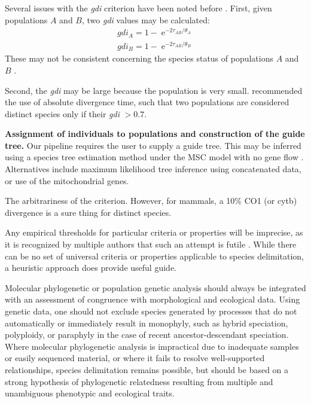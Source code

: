 \documentclass[A4]{article1}
\DeclareMathOperator{\e}{\mathrm{e}}
\begin{document}
Several issues with the \textit{gdi} criterion have been noted before \citep{Leache2019}.  
First, given populations $A$ and $B$, two \textit{gdi} values may be calculated:
\begin{equation}
   \begin{aligned}
      gdi_A = 1 - \e^{-2\tau _{AB}/\theta_A} \\
      gdi_B = 1 - \e^{-2\tau _{AB}/\theta_B}
   \end{aligned}
\end{equation}
These may not be consistent concerning the species status of populations $A$ and $B$
\citep{Leache2019}.

Second, the \textit{gdi} may be large because the population is very small.
\citet{Rannala2020} recommended the use of absolute divergence time, such that two
populations are considered distinct species only if their \textit{gdi} $> 0.7$.

\textbf{Assignment of individuals to populations and construction of the guide tree.}
Our pipeline requires the user to supply a guide tree.  This may be inferred using a
species tree estimation method under the MSC model with no gene flow \citep{Yang2014,
   Rannala2017}.  Alternatives include maximum likelihood tree inference using concatenated
data, or use of the mitochondrial genes.

The arbitrariness of the criterion.  However, for mammals, a 10\% CO1 (or cytb)
divergence is a sure thing for distinct species.

Any empirical thresholds for particular criteria or properties will be imprecise, as it
is recognized by multiple authors that such an attempt is futile \cite{Wells2022}. While
there can be no set of universal criteria or properties applicable to species
delimitation, a heuristic approach does provide useful guide.

Molecular phylogenetic or population genetic analysis should always be integrated with
an assessment of congruence with morphological and ecological data.  Using genetic data,
one should not exclude species generated by processes that do not automatically or
immediately result in monophyly, such as hybrid speciation, polyploidy, or paraphyly in
the case of recent ancestor-descendant speciation.  Where molecular phylogenetic
analysis is impractical due to inadequate samples or easily sequenced material, or where
it fails to resolve well-supported relationships, species delimitation remains possible,
but should be based on a strong hypothesis of phylogenetic relatedness resulting from
multiple and unambiguous phenotypic and ecological traits.
\end{document}
